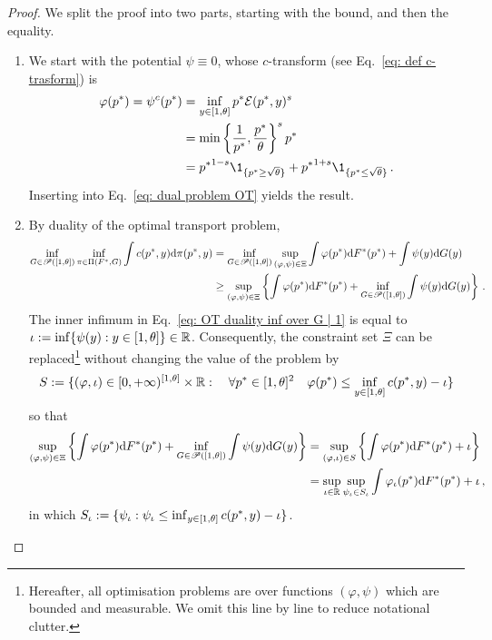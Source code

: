 \begin{proof}
We split the proof into two parts, starting with the bound, and then the equality.
\begin{enumerate}
    \item 
    We start with the potential $\psi\equiv0$, whose $c$-transform (see Eq.~\eqref{eq: def c-trasform}) is 
    \begin{align*}
\varphi(\price)=\psi^c(\price)&=\inf_{\pred\in\range}\price\error(\price,\pred)^{\smth} \\
    &=\min\left\{\frac1{\price},\frac{\price}\ub\right\}^{\smth}\price\\
    &={\price}^{1-\smth}\1_{\{\price\ge \sqrt{\ub}\}}+ {\price}^{1+\smth}\1_{\{\price\le \sqrt{\ub}\}}\,.
    \end{align*}
    Inserting into Eq.~\eqref{eq: dual problem OT} yields the result.
    \item By duality of the optimal transport problem, 
\begin{align}
    \inf_{G\in\mathscr{P}([1,\theta])}\inf_{\pi\in\Pi(F^*,G)}\int c(p^*,y)\mathrm{d}\pi(p^*,y)&= \inf_{G\in\mathscr{P}([1,\theta])}\sup_{(\varphi,\psi)\in\Xi}\int\varphi(p^*)\mathrm{d}F^*(p^*)+\int \psi(y)\mathrm{d}G(y)
    \notag\\
    &\ge \sup_{(\varphi,\psi)\in\Xi}\left\{\int\varphi(p^*)\mathrm{d}F^*(p^*)+\inf_{G\in\mathscr{P}([1,\theta])}\int \psi(y)\mathrm{d}G(y)\right\}\,.\label{eq: OT duality inf over G | 1}
\end{align}
The inner infimum in Eq.~\eqref{eq: OT duality inf over G | 1} is equal to $\iota:=\inf\{\psi(y):y\in[1,\theta]\}\in \mathbb{R}$. Consequently, the constraint set $\Xi$
can be replaced\footnote{Hereafter, all optimisation problems are over functions $(\varphi,\psi)$ which are bounded and measurable. We omit this line by line to reduce notational clutter.} without changing the value of the problem by 
\begin{align}
    S:=\{(\varphi,\iota)\in[0,+\infty)^{[1,\theta]} \times\mathbb{R}: \quad \forall p^*\in[1,\theta]^2\quad \varphi(p^*)\le \inf_{y\in[1,\theta]}c(p^*,y)-\iota\}
    \notag
\end{align}
so that 
\begin{align}
    \sup_{(\varphi,\psi)\in\Xi}\left\{\int\varphi(p^*)\mathrm{d}F^*(p^*)+\inf_{G\in\mathscr{P}([1,\theta])}\int \psi(y)\mathrm{d}G(y)\right\}&= \sup_{(\varphi,\iota)\in S}\left\{ \int \varphi(p^*) \mathrm{d}F^*(p^*) +\iota\right\}
    \notag\\
    &= \sup_{\iota\in\mathbb{R}}\sup_{\psi_\iota\in S_\iota}\int \varphi_\iota(p^*) \mathrm{d}F^*(p^*) +\iota\,,\label{eq: OT duality inf over G | 2}
\end{align}
in which $S_\iota:=\{\psi_\iota: \psi_\iota\le \inf_{y\in[1,\theta]}c(p^*,y)-\iota\}$.


\end{enumerate}
\end{proof}
